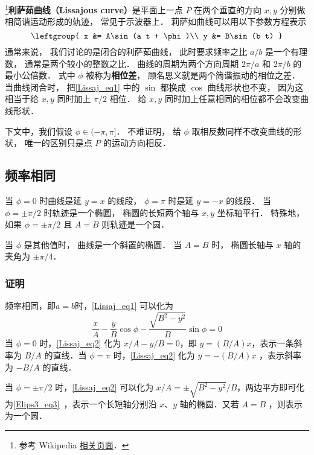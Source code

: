 
\begin{issues}
\issueDraft
\end{issues}


\footnote{参考 Wikipedia \href{https://en.wikipedia.org/wiki/Lissajous_curve}{相关页面}．}\textbf{利萨茹曲线（Lissajous curve）}是平面上一点 $P$ 在两个垂直的方向 $x, y$ 分别做相简谐运动形成的轨迹， 常见于示波器上． 莉萨如曲线可以用以下参数方程表示
\begin{equation}\label{Lissaj_eq1}
\leftgroup{
x &= A\sin(a t + \phi)\\
y &= B\sin(b t)
}\end{equation}
通常来说， 我们讨论的是闭合的利萨茹曲线， 此时要求频率之比 $a/b$ 是一个有理数， 通常是两个较小的整数之比． 曲线的周期为两个方向周期 $2\pi/a$ 和 $2\pi/b$ 的最小公倍数． 式中 $\phi$ 被称为\textbf{相位差}， 顾名思义就是两个简谐振动的相位之差． 当曲线闭合时， 把\autoref{Lissaj_eq1} 中的 $\sin$ 都换成 $\cos$ 曲线形状也不变， 因为这相当于给 $x, y$ 同时加上 $\pi/2$ 相位． 给 $x, y$ 同时加上任意相同的相位都不会改变曲线形状．

下文中，我们假设 $\phi \in (-\pi, \pi]$． 不难证明， 给 $\phi$ 取相反数同样不改变曲线的形状， 唯一的区别只是点 $P$ 的运动方向相反．

\subsection{频率相同}
当 $\phi = 0$ 时曲线是延 $y=x$ 的线段， $\phi = \pi$ 时是延 $y=-x$ 的线段． 当 $\phi = \pm\pi/2$ 时轨迹是一个椭圆， 椭圆的长短两个轴与 $x,y$ 坐标轴平行． 特殊地， 如果 $\phi = \pm\pi/2$ 且 $A = B$ 则轨迹是一个圆．

当 $\phi$ 是其他值时， 曲线是一个斜置的椭圆． 当 $A = B$ 时， 椭圆长轴与 $x$ 轴的夹角为 $\pm\pi/4$．
\subsubsection{证明}
频率相同，即$a=b$时，\autoref{Lissaj_eq1} 可以化为
\begin{equation}\label{Lissaj_eq2}
\frac xA-\frac yB\cos\phi-\frac{\sqrt{B^2-y^2}}{B}\sin\phi=0
\end{equation}
当 $\phi=0$ 时，\autoref{Lissaj_eq2} 化为 $x/A-y/B=0$，即 $y=(B/A)x$，表示一条斜率为 $B/A$ 的直线．当 $\phi=\pi$ 时，\autoref{Lissaj_eq2} 化为 $y=-(B/A)x$ ，表示斜率为 $-B/A$ 的直线．

当 $\phi=\pm\pi/2$ 时，\autoref{Lissaj_eq2} 可以化为 $x/A=\pm\sqrt{B^2-y^2}/B$，两边平方即可化为\autoref{Elips3_eq3}~，表示一个长短轴分别沿 $x$、$y$ 轴的椭圆．又若 $A=B$ ，则表示为一个圆．

